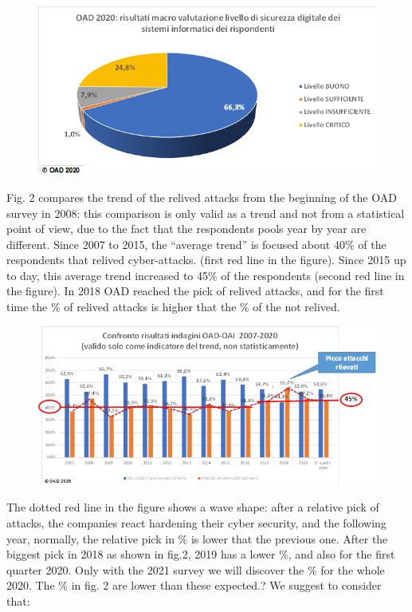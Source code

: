 \documentclass{easychair}
\begin{document}
\begin{figure}
	\centering
		\includegraphics[width=1\textwidth]{pictures/fig1.png}
		\caption{}
		\label{fig:1}
\end{figure}

Fig. 2 compares the trend of the relived attacks from the beginning of the OAD survey in 2008: this comparison is only valid as a trend and not from a statistical point 
of view, due to the fact that the respondents pools year by year are different. Since 2007 to 2015, the “average trend” is focused about 40\% of the respondents that relived
cyber-attacks. (first red line in the figure). Since 2015 up to day, this average trend increased to 45\% of the respondents (second red line in the figure). In 2018 OAD 
reached the pick of relived attacks, and  for the first time  the \% of relived attacks is higher that the \% of the not relived.


\begin{figure}
	\centering
		\includegraphics[width=1\textwidth]{pictures/fig2.png}
		\caption{}
		\label{fig:2}
\end{figure}


The dotted red line in the figure shows a wave shape: after a relative pick of attacks, the companies react hardening their cyber security, and the following year, normally, 
the relative pick in \% is lower that the previous one. After the biggest pick in 2018 as shown in fig.2,  2019 has a lower \%, and also for the first quarter 2020.
Only with the 2021 survey we will discover the \% for the whole 2020. The \%  in fig. 2 are lower than these expected.? We suggest to consider that:
\end{document}
